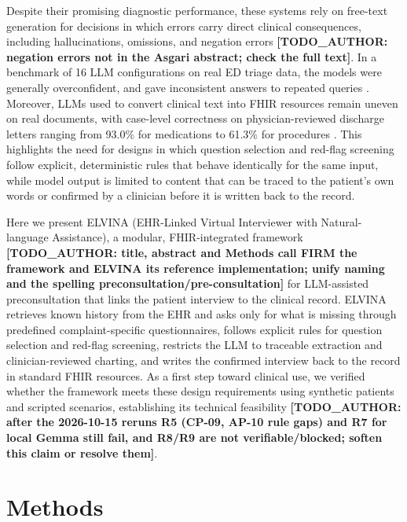 \documentclass[lineno,pdflatex,sn-basic]{sn-jnl}%
\theoremstyle{thmstyleone}%
\theoremstyle{thmstyletwo}%
\theoremstyle{thmstylethree}%
\begin{document}
Despite their promising diagnostic performance, these systems rely on free-text generation for decisions in which errors carry direct clinical consequences, including hallucinations, omissions, and negation errors \citep{asgariFrameworkAssessClinical2025} \textbf{[TODO\_AUTHOR: negation errors not in the Asgari abstract; check the full text]}. In a benchmark of 16 LLM configurations on real ED triage data, the models were generally overconfident, and gave inconsistent answers to repeated queries \citep{benningPerformanceEvaluationBenchmarking2026}. Moreover, LLMs used to convert clinical text into FHIR resources \citep{liyikuanFHIRGPTEnhancesHealth2024} remain uneven on real documents, with case-level correctness on physician-reviewed discharge letters ranging from 93.0\% for medications to 61.3\% for procedures \citep{eryilmazExtractingMedicalInformation2026}. This highlights the need for designs in which question selection and red-flag screening follow explicit, deterministic rules that behave identically for the same input, while model output is limited to content that can be traced to the patient's own words or confirmed by a clinician before it is written back to the record.

Here we present ELVINA (EHR-Linked Virtual Interviewer with Natural-language Assistance), a modular, FHIR-integrated framework \textbf{[TODO\_AUTHOR: title, abstract and Methods call FIRM the framework and ELVINA its reference implementation; unify naming and the spelling preconsultation/pre-consultation]} for LLM-assisted preconsultation that links the patient interview to the clinical record. ELVINA retrieves known history from the EHR and asks only for what is missing through predefined complaint-specific questionnaires, follows explicit rules for question selection and red-flag screening, restricts the LLM to traceable extraction and clinician-reviewed charting, and writes the confirmed interview back to the record in standard FHIR resources. As a first step toward clinical use, we verified whether the framework meets these design requirements using synthetic patients and scripted scenarios, establishing its technical feasibility \textbf{[TODO\_AUTHOR: after the 2026-10-15 reruns R5 (CP-09, AP-10 rule gaps) and R7 for local Gemma still fail, and R8/R9 are not verifiable/blocked; soften this claim or resolve them]}.


\section{Methods}\label{sec:methods}
\end{document}
